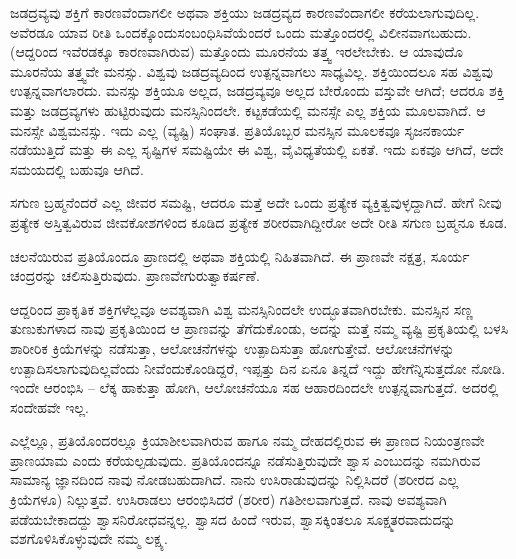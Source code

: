 \vskip 1.5pt

ಜಡದ್ರವ್ಯವು ಶಕ್ತಿಗೆ ಕಾರಣವೆಂದಾಗಲೀ ಅಥವಾ ಶಕ್ತಿಯು ಜಡದ್ರವ್ಯದ ಕಾರಣವೆಂದಾಗಲೀ ಕರೆಯಲಾಗುವುದಿಲ್ಲ. ಅವೆರಡೂ ಯಾವ ರೀತಿ ಒಂದಕ್ಕೊಂದು\break ಸಂಬಂಧಿಸಿವೆಯೆಂದರೆ ಒಂದು ಮತ್ತೊಂದರಲ್ಲಿ ವಿಲೀನವಾಗಬಹುದು. (ಆದ್ದರಿಂದ ಇವೆರಡಕ್ಕೂ ಕಾರಣವಾಗಿರುವ) ಮತ್ತೊಂದು ಮೂರನೆಯ ತತ್ತ್ವ ಇರಲೇಬೇಕು. ಆ ಯಾವುದೊ ಮೂರನೆಯ ತತ್ತ್ವವೇ ಮನಸ್ಸು. ವಿಶ್ವವು ಜಡದ್ರವ್ಯದಿಂದ ಉತ್ಪನ್ನವಾಗಲು ಸಾಧ್ಯವಿಲ್ಲ. ಶಕ್ತಿಯಿಂದಲೂ ಸಹ ವಿಶ್ವವು ಉತ್ಪನ್ನವಾಗಲಾರದು. ಮನಸ್ಸು ಶಕ್ತಿಯೂ ಅಲ್ಲದ, ಜಡದ್ರವ್ಯವೂ ಅಲ್ಲದ ಬೇರೊಂದು ವಸ್ತುವೇ ಆಗಿದೆ; ಆದರೂ ಶಕ್ತಿ ಮತ್ತು ಜಡದ್ರವ್ಯಗಳು ಹುಟ್ಟಿರುವುದು ಮನಸ್ಸಿನಿಂದಲೇ. ಕಟ್ಟಕಡೆಯಲ್ಲಿ ಮನಸ್ಸೇ ಎಲ್ಲ ಶಕ್ತಿಯ ಮೂಲವಾಗಿದೆ. ಆ ಮನಸ್ಸೇ ವಿಶ್ವಮನಸ್ಸು. ಇದು ಎಲ್ಲ (ವ್ಯಷ್ಟಿ) ಸಂಘಾತ. ಪ್ರತಿಯೊಬ್ಬರ ಮನಸ್ಸಿನ ಮೂಲಕವೂ ಸೃಜನಕಾರ್ಯ ನಡೆಯುತ್ತಿದೆ ಮತ್ತು ಈ ಎಲ್ಲ ಸೃಷ್ಟಿಗಳ ಸಮಷ್ಟಿಯೇ ಈ ವಿಶ್ವ, ವೈವಿಧ್ಯತೆಯಲ್ಲಿ ಏಕತೆ. ಇದು ಏಕವೂ ಆಗಿದೆ, ಅದೇ ಸಮಯದಲ್ಲಿ ಬಹುವೂ ಆಗಿದೆ.

\vskip 1.5pt

ಸಗುಣ ಬ್ರಹ್ಮನೆಂದರೆ ಎಲ್ಲ ಜೀವರ ಸಮಷ್ಟಿ, ಆದರೂ ಮತ್ತೆ ಅದೇ ಒಂದು ಪ್ರತ್ಯೇಕ ವ್ಯಕ್ತಿತ್ವವುಳ್ಳದ್ದಾಗಿದೆ. ಹೇಗೆ ನೀವು ಪ್ರತ್ಯೇಕ ಅಸ್ತಿತ್ವವಿರುವ ಜೀವಕೋಶಗಳಿಂದ ಕೂಡಿದ ಪ್ರತ್ಯೇಕ ಶರೀರವಾಗಿದ್ದೀರೋ ಅದೇ ರೀತಿ ಸಗುಣ ಬ್ರಹ್ಮನೂ ಕೂಡ.

\vskip 1.5pt

ಚಲನೆಯಿರುವ ಪ್ರತಿಯೊಂದೂ ಪ್ರಾಣದಲ್ಲಿ ಅಥವಾ ಶಕ್ತಿಯಲ್ಲಿ ನಿಹಿತವಾಗಿದೆ. ಈ ಪ್ರಾಣವೇ ನಕ್ಷತ್ರ, ಸೂರ್ಯ ಚಂದ್ರರನ್ನು ಚಲಿಸುತ್ತಿರುವುದು. ಪ್ರಾಣವೇ\break ಗುರುತ್ವಾಕರ್ಷಣೆ.

\vskip 1.5pt

ಆದ್ದರಿಂದ ಪ್ರಾಕೃತಿಕ ಶಕ್ತಿಗಳೆಲ್ಲವೂ ಅವಶ್ಯವಾಗಿ ವಿಶ್ವ ಮನಸ್ಸಿನಿಂದಲೇ ಉದ್ಭೂತವಾಗಿರಬೇಕು. ಮನಸ್ಸಿನ ಸಣ್ಣ ತುಣುಕುಗಳಾದ ನಾವು ಪ್ರಕೃತಿಯಿಂದ ಆ ಪ್ರಾಣವನ್ನು ತೆಗೆದುಕೊಂಡು, ಅದನ್ನು ಮತ್ತೆ ನಮ್ಮ ವ್ಯಷ್ಟಿ ಪ್ರಕೃತಿಯಲ್ಲಿ ಬಳಸಿ ಶಾರೀರಿಕ ಕ್ರಿಯೆಗಳನ್ನು ನಡೆಸುತ್ತಾ, ಆಲೋಚನೆಗಳನ್ನು ಉತ್ಪಾದಿಸುತ್ತಾ ಹೋಗುತ್ತೇವೆ. ಆಲೋಚನೆಗಳನ್ನು ಉತ್ಪಾದಿಸಲಾಗುವುದಿಲ್ಲವೆಂದು ನೀವೆಂದುಕೊಂಡಿದ್ದರೆ, ಇಪ್ಪತ್ತು ದಿನ ಏನೂ ತಿನ್ನದೆ ಇದ್ದು ಹೇಗೆನ್ನಿಸುತ್ತದೋ ನೋಡಿ. ಇಂದೇ ಆರಂಭಿಸಿ – ಲೆಕ್ಕ ಹಾಕುತ್ತಾ ಹೋಗಿ, ಆಲೋಚನೆಯೂ ಸಹ ಆಹಾರದಿಂದಲೇ ಉತ್ಪನ್ನವಾಗುತ್ತದೆ. ಅದರಲ್ಲಿ ಸಂದೇಹವೇ ಇಲ್ಲ.

\vskip 1.5pt

ಎಲ್ಲೆಲ್ಲೂ, ಪ್ರತಿಯೊಂದರಲ್ಲೂ ಕ್ರಿಯಾಶೀಲವಾಗಿರುವ ಹಾಗೂ ನಮ್ಮ ದೇಹದಲ್ಲಿರುವ ಈ ಪ್ರಾಣದ ನಿಯಂತ್ರಣವೇ ಪ್ರಾಣಯಾಮ ಎಂದು ಕರೆಯಲ್ಪಡುವುದು. ಪ್ರತಿಯೊಂದನ್ನೂ ನಡೆಸುತ್ತಿರುವುದೇ ಶ್ವಾಸ ಎಂಬುದನ್ನು ನಮಗಿರುವ ಸಾಮಾನ್ಯ ಜ್ಞಾನದಿಂದ ನಾವು ನೋಡಬಹುದಾಗಿದೆ. ನಾನು ಉಸಿರಾಡುವುದನ್ನು ನಿಲ್ಲಿಸಿದರೆ (ಶರೀರದ ಎಲ್ಲ ಕ್ರಿಯೆಗಳೂ) ನಿಲ್ಲುತ್ತವೆ. ಉಸಿರಾಡಲು ಆರಂಭಿಸಿದರೆ (ಶರೀರ) ಗತಿಶೀಲವಾಗುತ್ತದೆ. ನಾವು ಅವಶ್ಯವಾಗಿ ಪಡೆಯಬೇಕಾದದ್ದು ಶ್ವಾಸನಿರೋಧವನ್ನಲ್ಲ. ಶ್ವಾಸದ ಹಿಂದೆ ಇರುವ, ಶ್ವಾಸಕ್ಕಿಂತಲೂ ಸೂಕ್ಷ್ಮತರವಾದುದನ್ನು ವಶಗೊಳಿಸಿಕೊಳ್ಳುವುದೇ ನಮ್ಮ ಲಕ್ಷ್ಯ.

\vskip 1.5pt

